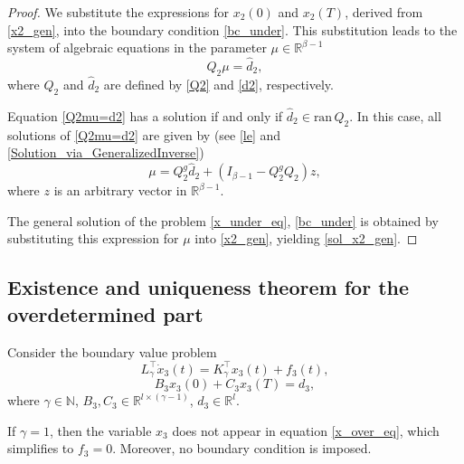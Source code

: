 \documentclass[preprint,12pt]{elsarticle}
\numberwithin{equation}{section}
\theoremstyle{definition}
\begin{document}
\begin{proof}
We substitute the expressions for $x_2(0)$ and $x_2(T)$, derived from \eqref{x2_gen}, into the boundary condition \eqref{bc_under}. This substitution leads to the system of algebraic equations in the parameter $\mu\in\mathbb{R}^{\beta-1}$ 
\begin{equation}\label{Q2mu=d2}
   Q_2\mu=\widehat{d}_2,
\end{equation}
where $Q_2$ and $\widehat{d}_2$ are defined by \eqref{Q2} and \eqref{d2}, respectively.

Equation \eqref{Q2mu=d2}  has a solution if and only if $\widehat{d}_2 \in \mbox{ran}\, Q_2$. In this case, all solutions of \eqref{Q2mu=d2} are given by (see \eqref{le} and \eqref{Solution_via_GeneralizedInverse})
\begin{equation*}
    \mu=Q_2^g\widehat{d}_2+(I_{\beta-1}-Q_2^g Q_2)z,
\end{equation*}
where  $z$ is an arbitrary vector in $\mathbb{R}^{\beta-1}$.

The general solution of the problem \eqref{x_under_eq}, \eqref{bc_under} is obtained by substituting this expression for $\mu$ into \eqref{x2_gen}, yielding \eqref{sol_x2_gen}.
\end{proof}


\subsection{Existence and uniqueness theorem for the overdetermined part}

Consider the boundary value problem
\begin{equation}\label{x_over_eq}
L_{\gamma}^\top\dot{x}_3(t)=K_{\gamma}^\top x_3(t)+f_3(t),
\end{equation}
\begin{equation}\label{bc_over}
    B_3x_3(0)+C_3x_3(T)=d_3,\end{equation}
where $\gamma\in\mathbb{N}$, $B_3, C_3 \in\mathbb{R}^{l\times(\gamma-1)}$, $d_3\in\mathbb{R}^l$.

If $\gamma=1$, then the variable $x_3$ does not appear in equation \eqref{x_over_eq}, which simplifies to $f_3=0$. Moreover, no boundary condition is imposed. 
\end{document}
